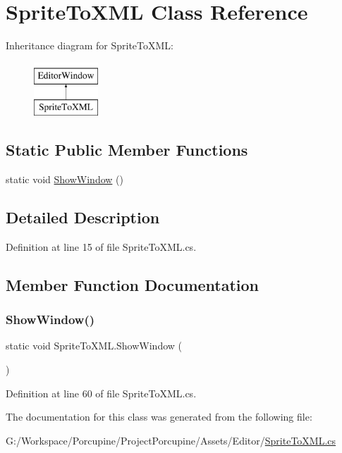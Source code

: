 \hypertarget{class_sprite_to_x_m_l}{}\section{Sprite\+To\+X\+ML Class Reference}
\label{class_sprite_to_x_m_l}
Inheritance diagram for Sprite\+To\+X\+ML\+:\begin{figure}[H]
\begin{center}
\leavevmode
\includegraphics[height=2.000000cm]{class_sprite_to_x_m_l}
\end{center}
\end{figure}
\subsection*{Static Public Member Functions}
\begin{DoxyCompactItemize}
\item 
static void \hyperlink{class_sprite_to_x_m_l_a679d6f88cdda86febd30ac2dc6da7813}{Show\+Window} ()
\end{DoxyCompactItemize}


\subsection{Detailed Description}


Definition at line 15 of file Sprite\+To\+X\+M\+L.\+cs.



\subsection{Member Function Documentation}
\mbox{\label{class_sprite_to_x_m_l_a679d6f88cdda86febd30ac2dc6da7813}} 
\subsubsection{\texorpdfstring{Show\+Window()}{ShowWindow()}}
{\footnotesize\ttfamily static void Sprite\+To\+X\+M\+L.\+Show\+Window (\begin{DoxyParamCaption}{ }\end{DoxyParamCaption})\hspace{0.3cm}{\ttfamily [static]}}



Definition at line 60 of file Sprite\+To\+X\+M\+L.\+cs.



The documentation for this class was generated from the following file\+:\begin{DoxyCompactItemize}
\item 
G\+:/\+Workspace/\+Porcupine/\+Project\+Porcupine/\+Assets/\+Editor/\hyperlink{_sprite_to_x_m_l_8cs}{Sprite\+To\+X\+M\+L.\+cs}\end{DoxyCompactItemize}
